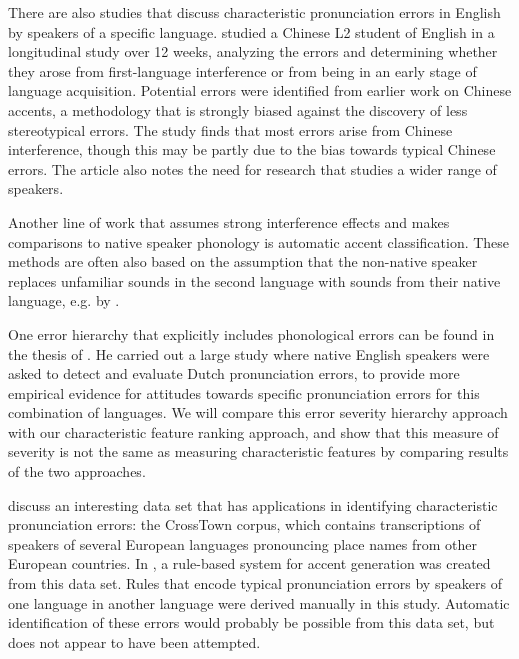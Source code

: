 \documentclass[output=paper]{LSP/langsci}
\begin{document}
There are also studies that discuss characteristic pronunciation errors in English by speakers of a specific language. \citet{gao_pronunciation_2005} studied a Chinese L2 student of English in a longitudinal study over 12 weeks, analyzing the errors and determining whether they arose from first-language interference or from being in an early stage of language acquisition. Potential errors were identified from earlier work on Chinese accents, a methodology that is strongly biased against the discovery of less stereotypical errors. The study finds that most errors arise from Chinese interference, though this may be partly due to the bias towards typical Chinese errors. The article also notes the need for research that studies a wider range of speakers.

Another line of work that assumes strong interference effects and makes comparisons to native speaker phonology is automatic accent classification. These methods are often also based on the assumption that the non-native speaker replaces unfamiliar sounds in the second language with sounds from their native language, e.g. by \citet{angkititrakul_advances_2006}.

One error hierarchy that explicitly includes phonological errors can be found in the thesis of \citet{van_den_doel_evaluation_2006}. He carried out a large study where native English speakers were asked to detect and evaluate Dutch pronunciation errors, to provide more empirical evidence for attitudes towards specific pronunciation errors for this combination of languages. We will compare this error severity hierarchy approach with our characteristic feature ranking approach, and show that this measure of severity is not the same as measuring characteristic features by comparing results of the two approaches.

\citet{schaden_casselberveetovallarga_2006} discuss an interesting data set that has applications in identifying characteristic pronunciation errors: the CrossTown corpus, which contains transcriptions of speakers of several European languages pronouncing place names from other European countries. In \citet{schaden_crosstowns_2004}, a rule-based system for accent generation was created from this data set. Rules that encode typical pronunciation errors by speakers of one language in another language were derived manually in this study. Automatic identification of these errors would probably be possible from this data set, but does not appear to have been attempted.
\end{document}
